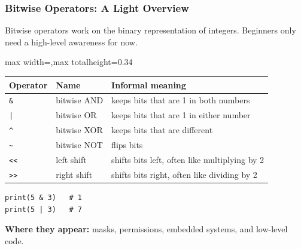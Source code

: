 \documentclass[aspectratio=169,10pt]{beamer}
\newcommand{\keyword}[1]{\textcolor{PrimaryBlue}{\textbf{#1}}}
\begin{document}
\begin{frame}[fragile]
\frametitle{Bitwise Operators: A Light Overview}
\begin{tcolorbox}[lecturebox,title=Key idea]
Bitwise operators work on the binary representation of integers. Beginners only need a high-level awareness for now.
\end{tcolorbox}

\small
\begin{adjustbox}{max width=\textwidth,max totalheight=0.34\textheight}
\begin{tabular}{@{}p{1.6cm}p{3.1cm}p{7.0cm}@{}}
\toprule
\textbf{Operator} & \textbf{Name} & \textbf{Informal meaning} \\
\midrule
\texttt{\&} & bitwise AND & keeps bits that are 1 in both numbers \\
\texttt{|} & bitwise OR & keeps bits that are 1 in either number \\
\texttt{\^{}} & bitwise XOR & keeps bits that are different \\
\texttt{\textasciitilde} & bitwise NOT & flips bits \\
\texttt{<<} & left shift & shifts bits left, often like multiplying by 2 \\
\texttt{>>} & right shift & shifts bits right, often like dividing by 2 \\
\bottomrule
\end{tabular}
\end{adjustbox}

\begin{lstlisting}[style=pycodesmall]
print(5 & 3)   # 1
print(5 | 3)   # 7
\end{lstlisting}

{\small \keyword{Where they appear:} masks, permissions, embedded systems, and low-level code.}
\end{frame}
\end{document}
